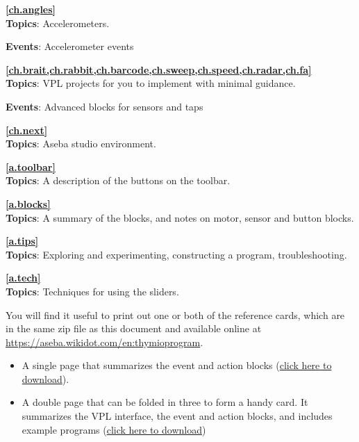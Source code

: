 {\centering \textbf{\cref{ch.angles}}\\}
\textbf{Topics}: Accelerometers.

\textbf{Events}: Accelerometer events

 \quad {}

\bigskip

{\centering
\textbf{\cref{ch.brait,ch.rabbit,ch.barcode,ch.sweep,ch.speed,ch.radar,ch.fa}}\\}
\textbf{Topics}: VPL projects for you to implement with minimal
guidance.

\textbf{Events}: Advanced blocks for sensors and taps

 \quad {}
\quad {}

\bigskip

{\centering \textbf{\cref{ch.next}}\\}
\textbf{Topics}: Aseba studio environment.

\medskip

{\centering \textbf{\cref{a.toolbar}}\\}
\textbf{Topics}: A description of the buttons on the toolbar.

\medskip

{\centering \textbf{\cref{a.blocks}}\\}
\textbf{Topics}: A summary of the blocks, and
notes on motor, sensor and button blocks.

\medskip
{\centering \textbf{\cref{a.tips}}\\}
\textbf{Topics}: Exploring and experimenting,
constructing a program, troubleshooting.

\medskip

{\centering \textbf{\cref{a.tech}}\\}
\textbf{Topics}: Techniques for using the sliders.


You will find it useful to print out one or both of the reference cards,
which are in the same zip file as this document and available
online at \url{https://aseba.wikidot.com/en:thymioprogram}.

\begin{itemize}
\item A single page that summarizes the event and action blocks
(\href{https://aseba.wdfiles.com/local--files/en:thymioprogram/thymio-vpl-ref-card-en.pdf}{click here to download}).
\item A double page that can be folded in three to form a handy card.
It summarizes the VPL interface, the event and action blocks,
and includes example programs
(\href{https://aseba.wdfiles.com/local--files/en:thymioprogram/thymio-vpl-folding-ref-card-en.pdf}{click here to download})
\end{itemize}
